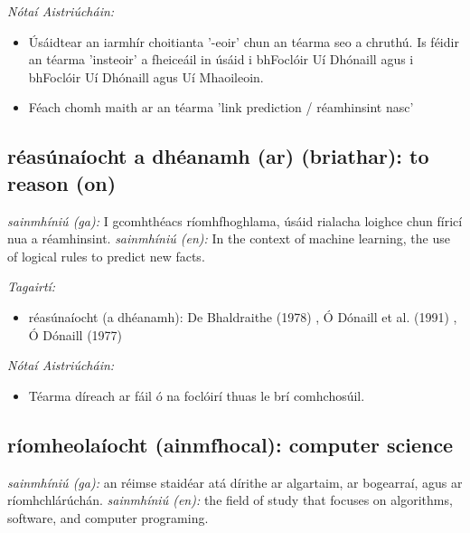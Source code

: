 \documentclass{article}
\begin{document}
 \noindent \textit{Nótaí Aistriúcháin:}
\begin{itemize}
	\item Úsáidtear an iarmhír choitianta '-eoir' chun an téarma seo a chruthú. Is féidir an téarma 'insteoir' a fheiceáil in úsáid i bhFoclóir Uí Dhónaill agus i bhFoclóir Uí Dhónaill agus Uí Mhaoileoin.
	\item Féach chomh maith ar an téarma 'link prediction / réamhinsint nasc'
\end{itemize}


\subsection*{réasúnaíocht a dhéanamh (ar) (briathar): to reason (on)} 
 \noindent \textit{sainmhíniú (ga):} I gcomhthéacs ríomhfhoghlama, úsáid rialacha loighce chun fíricí nua a réamhinsint.
\newline\newline
 \noindent \textit{sainmhíniú (en):} In the context of machine learning, the use of logical rules to predict new facts.
\newline

 \noindent \textit{Tagairtí:}
\begin{itemize}
	\item réasúnaíocht (a dhéanamh): De Bhaldraithe (1978) \cite{de-bhaldraithe}, Ó Dónaill et al. (1991) \cite{focloir-beag}, Ó Dónaill (1977) \cite{odonaill}
\end{itemize}

 \noindent \textit{Nótaí Aistriúcháin:}
\begin{itemize}
	\item Téarma díreach ar fáil ó na foclóirí thuas le brí comhchosúil.
\end{itemize}


\subsection*{ríomheolaíocht (ainmfhocal): computer science} 
 \noindent \textit{sainmhíniú (ga):} an réimse staidéar atá dírithe ar algartaim, ar bogearraí, agus ar ríomhchlárúchán.
\newline\newline
 \noindent \textit{sainmhíniú (en):} the field of study that focuses on algorithms, software, and computer programing.
\newline
\end{document}
